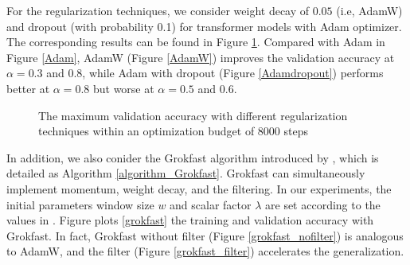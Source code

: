 \documentclass[UTF8]{article}
\begin{document}
For the regularization techniques, we consider weight decay of $0.05$ (i.e, AdamW) and dropout (with probability 0.1) for transformer models with Adam optimizer. The corresponding results can be found in Figure \ref{regularization}. Compared with Adam in Figure \ref{Adam}, AdamW (Figure \ref{AdamW}) improves the validation accuracy at $\alpha=0.3$ and $0.8$, while Adam with dropout (Figure \ref{Adamdropout}) performs better at $\alpha=0.8$ but worse at $\alpha=0.5$ and $0.6$.

\begin{figure}[H]
  \centering
  \vspace{-6mm}
  \caption{The maximum
  validation accuracy with different regularization techniques within an
optimization budget of $8000$ steps}
  \label{regularization} 
\end{figure}

In addition, we also conider the Grokfast algorithm introduced by \cite{lee2024grokfast}, which is detailed as Algorithm \ref{algorithm_Grokfast}. Grokfast can simultaneously implement momentum, weight decay, and the filtering. In our experiments, the initial parameters window size $w$ and scalar factor $\lambda$ are set according to the values in \cite{lee2024grokfast}. Figure plots \ref{grokfast} the training and validation accuracy with Grokfast. In fact, Grokfast without filter (Figure \ref{grokfast_nofilter}) is analogous to AdamW, and the filter (Figure \ref{grokfast_filter})
accelerates the generalization.
\end{document}
